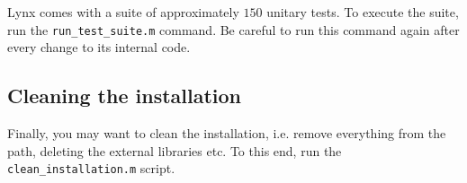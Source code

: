 Lynx comes with a suite of approximately $150$ unitary tests. To execute the suite, run the \verb|run_test_suite.m| command. Be careful to run this command again after every change to its internal code.

\subsection{Cleaning the installation}

Finally, you may want to clean the installation, i.e. remove everything from the path, deleting the external libraries etc. To this end, run the \verb|clean_installation.m| script.
